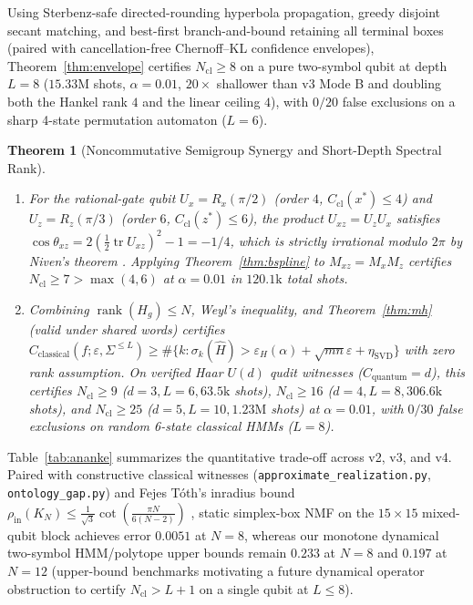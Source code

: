 \documentclass[11pt]{article}
\newtheorem{theorem}{Theorem}
\theoremstyle{definition}
\newcommand{\eps}{\varepsilon}
\newcommand{\Tr}{\operatorname{tr}}
\begin{document}
Using Sterbenz-safe directed-rounding hyperbola propagation, greedy disjoint secant matching, and best-first branch-and-bound retaining all terminal boxes (paired with cancellation-free Chernoff--KL confidence envelopes), Theorem~\ref{thm:envelope} certifies $N_{\mathrm{cl}}\ge 8$ on a pure two-symbol qubit at depth $L=8$ ($15.33\text{M}$ shots, $\alpha=0.01$, $20\times$ shallower than v3 Mode B and doubling both the Hankel rank $4$ and the linear ceiling $4$), with $0/20$ false exclusions on a sharp 4-state permutation automaton ($L=6$).

\begin{theorem}[Noncommutative Semigroup Synergy and Short-Depth Spectral Rank]\label{thm:niven_rank}
\begin{enumerate}
\item For the rational-gate qubit $U_x=R_x(\pi/2)$ (order $4$, $C_{\mathrm{cl}}(x^*)\le 4$) and $U_z=R_z(\pi/3)$ (order $6$, $C_{\mathrm{cl}}(z^*)\le 6$), the product $U_{xz}=U_zU_x$ satisfies $\cos\theta_{xz}=2(\frac{1}{2}\Tr U_{xz})^2-1=-1/4$, which is strictly irrational modulo $2\pi$ by Niven's theorem \cite{Niven1956}. Applying Theorem~\ref{thm:bspline} to $M_{xz}=M_xM_z$ certifies $N_{\mathrm{cl}}\ge 7>\max(4,6)$ at $\alpha=0.01$ in $120.1\text{k}$ total shots.
\item Combining $\operatorname{rank}(H_g)\le N$, Weyl's inequality, and Theorem~\ref{thm:mh} (valid under shared words) certifies $C_{\mathrm{classical}}(f;\eps,\Sigma^{\le L})\ge \#\{k:\sigma_k(\hat{H})>\eps_H(\alpha)+\sqrt{mn}\eps+\eta_{\mathrm{SVD}}\}$ with zero rank assumption. On verified Haar $U(d)$ qudit witnesses ($C_{\mathrm{quantum}}=d$), this certifies $N_{\mathrm{cl}}\ge 9$ ($d=3,L=6,63.5\text{k}$ shots), $N_{\mathrm{cl}}\ge 16$ ($d=4,L=8,306.6\text{k}$ shots), and $N_{\mathrm{cl}}\ge 25$ ($d=5,L=10,1.23\text{M}$ shots) at $\alpha=0.01$, with $0/30$ false exclusions on random 6-state classical HMMs ($L=8$).
\end{enumerate}
\end{theorem}

Table~\ref{tab:ananke} summarizes the quantitative trade-off across v2, v3, and v4. Paired with constructive classical witnesses (\texttt{approximate\_realization.py}, \texttt{ontology\_gap.py}) and Fejes T\'oth's inradius bound $\rho_{\mathrm{in}}(K_N)\le \frac{1}{\sqrt{3}}\cot(\frac{\pi N}{6(N-2)})$ \cite{FejesToth1953}, static simplex-box NMF on the $15\times 15$ mixed-qubit block achieves error $0.0051$ at $N=8$, whereas our monotone dynamical two-symbol HMM/polytope upper bounds remain $0.233$ at $N=8$ and $0.197$ at $N=12$ (upper-bound benchmarks motivating a future dynamical operator obstruction to certify $N_{\mathrm{cl}}>L+1$ on a single qubit at $L\le 8$).
\end{document}
